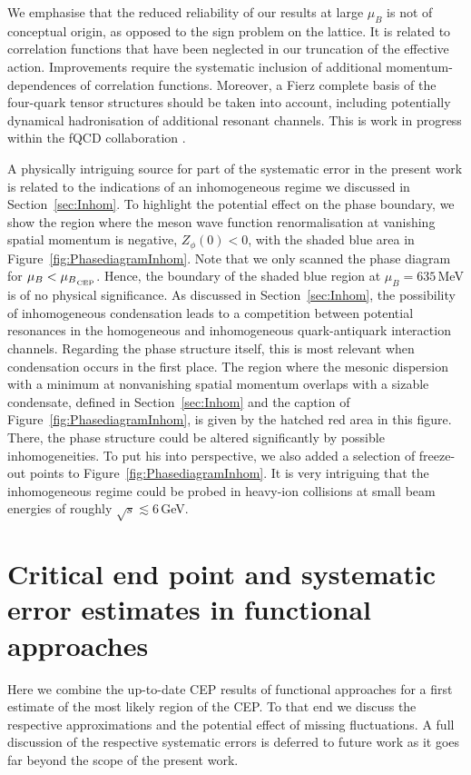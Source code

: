 \documentclass[%
reprint,
superscriptaddress,
showpacs,preprintnumbers,
 amsmath,amssymb,
 aps,
prd,
]{revtex4-1}
\def\Fig#1{Figure~\ref{#1}}
\def\sec#1{Section~\ref{#1}}
\begin{document}
We emphasise that the reduced reliability of our results at large
$\mu_B$ is not of conceptual origin, as opposed to the sign problem on
the lattice. It is related to correlation functions that have been
neglected in our truncation of the effective action. Improvements
require the systematic inclusion of additional momentum-dependences of
correlation functions. Moreover, a Fierz complete basis of the
four-quark tensor structures should be taken into account, including
potentially dynamical hadronisation of additional resonant channels.
This is work in progress within the fQCD collaboration \cite{fQCD}.

A physically intriguing source for part of the systematic error in the
present work is related to the indications of an inhomogeneous regime
we discussed in \sec{sec:Inhom}. To highlight the potential effect on
the phase boundary, we show the region where the meson wave function
renormalisation at vanishing spatial momentum is negative,
$Z_\phi(0) < 0$, with the shaded blue area in
\Fig{fig:PhasediagramInhom}. Note that we only scanned the phase
diagram for $\mu_B < {\mu_B}_{_{\tiny{\text{CEP}}}}$. Hence, the
boundary of the shaded blue region at $\mu_B = 635$\,MeV is of no
physical significance. As discussed in \sec{sec:Inhom}, the
possibility of inhomogeneous condensation leads to a competition
between potential resonances in the homogeneous and inhomogeneous
quark-antiquark interaction channels. Regarding the phase structure
itself, this is most relevant when condensation occurs in the first
place. The region where the mesonic dispersion with a minimum at
nonvanishing spatial momentum overlaps with a sizable condensate,
defined in \sec{sec:Inhom} and the caption of
\Fig{fig:PhasediagramInhom}, is given by the hatched red area in this
figure. There, the phase structure could be altered significantly by
possible inhomogeneities. To put his into perspective, we also added a
selection of freeze-out points to \Fig{fig:PhasediagramInhom}. It is
very intriguing that the inhomogeneous regime could be probed in
heavy-ion collisions at small beam energies of roughly
$\sqrt{s} \lesssim 6$\,GeV.


\section{Critical end point and systematic error estimates in
  functional approaches}\label{sec:SysFun}

Here we combine the up-to-date CEP results of functional approaches
for a first estimate of the most likely region of the CEP. To that end
we discuss the respective approximations and the potential effect of
missing fluctuations. A full discussion of the respective systematic
errors is deferred to future work as it goes far beyond the scope of
the present work.
\end{document}
